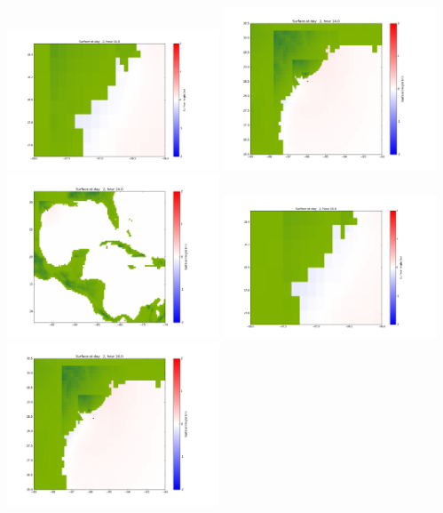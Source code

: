 \documentclass[11pt]{article}
\begin{document}
\vskip 10pt 
\includegraphics[width=0.475\textwidth]{frame0055fig1001.png}
\includegraphics[width=0.475\textwidth]{frame0055fig1002.png}
\vskip 10pt 
\includegraphics[width=0.475\textwidth]{frame0055fig1003.png}
\vskip 10pt 
\includegraphics[width=0.475\textwidth]{frame0056fig1001.png}
\includegraphics[width=0.475\textwidth]{frame0056fig1002.png}
\end{document}
